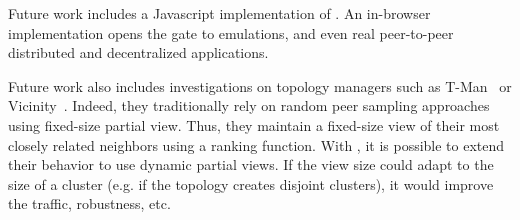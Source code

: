 Future work includes a Javascript implementation of \SPRAY. An in-browser
implementation opens the gate to emulations, and even real peer-to-peer
distributed and decentralized applications.

Future work also includes investigations on topology managers such as
T-Man~\cite{jelasity2009tman} or
Vicinity~\cite{voulgaris2005epidemic}. Indeed, they traditionally rely
on random peer sampling approaches using fixed-size partial
view. Thus, they maintain a fixed-size view of their most closely
related neighbors using a ranking function. With \SPRAY, it is
possible to extend their behavior to use dynamic partial views. If
the view size could adapt to the size of a cluster (e.g. if the topology
creates disjoint clusters), it would improve the traffic, robustness,
etc.

